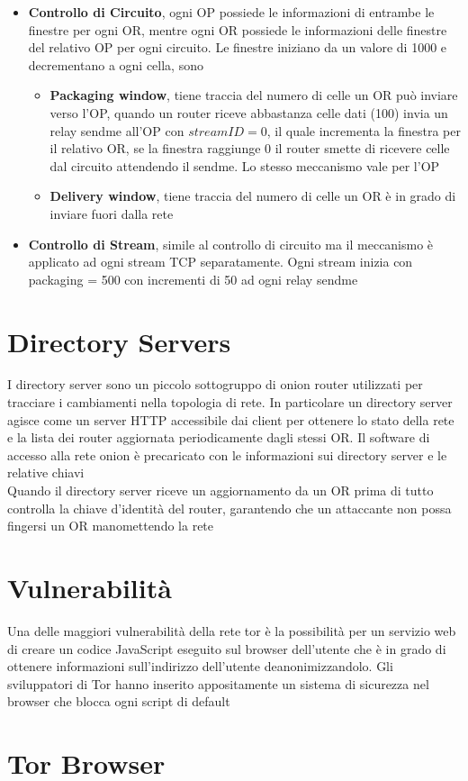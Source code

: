 \begin{itemize}
    \item \textbf{Controllo di Circuito}, ogni OP possiede le informazioni di entrambe le finestre per ogni OR, mentre ogni OR possiede le informazioni delle finestre del relativo OP per ogni circuito. Le finestre iniziano da un valore di 1000 e decrementano a ogni cella, sono
    \begin{itemize}
        \item \textbf{Packaging window}, tiene traccia del numero di celle un OR può inviare verso l'OP, quando un router riceve abbastanza celle dati (100) invia un relay sendme all'OP con $streamID = 0$, il quale incrementa la finestra per il relativo OR, se la finestra raggiunge 0 il router smette di ricevere celle dal circuito attendendo il sendme. Lo stesso meccanismo vale per l'OP
        \item \textbf{Delivery window}, tiene traccia del numero di celle un OR è in grado di inviare fuori dalla rete
    \end{itemize}
    \item \textbf{Controllo di Stream}, simile al controllo di circuito ma il meccanismo è applicato ad ogni stream TCP separatamente. Ogni stream inizia con packaging = 500 con incrementi di 50 ad ogni relay sendme
\end{itemize}

\newpage
\section{Directory Servers}
I directory server sono un piccolo sottogruppo di onion router utilizzati per tracciare i cambiamenti nella topologia di rete. In particolare un directory server agisce come un server HTTP accessibile dai client per ottenere lo stato della rete e la lista dei router aggiornata periodicamente dagli stessi OR. Il software di accesso alla rete onion è precaricato con le informazioni sui directory server e le relative chiavi \\
Quando il directory server riceve un aggiornamento da un OR prima di tutto controlla la chiave d'identità del router, garantendo che un attaccante non possa fingersi un OR manomettendo la rete \cite{ChaumMixes}
\section{Vulnerabilità} %
Una delle maggiori vulnerabilità della rete tor è la possibilità per un servizio web di creare un codice JavaScript eseguito sul browser dell'utente che è in grado di ottenere informazioni sull'indirizzo dell'utente deanonimizzandolo. Gli sviluppatori di Tor hanno inserito appositamente un sistema di sicurezza nel browser che blocca ogni script di default

\section{Tor Browser}
